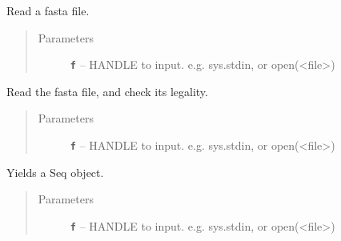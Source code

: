 \documentclass[letterpaper,10pt,english]{sphinxmanual}
\begin{document}

\begin{fulllineitems}
\label{reference/PyDNAutil:PyDNAutil.NormalizeIndex}
\end{fulllineitems}


\begin{fulllineitems}
\label{reference/PyDNAutil:PyDNAutil.ReadFasta}
Read a fasta file.
\begin{quote}\begin{description}
\item[{Parameters}] \leavevmode
\textbf{\texttt{f}} -- HANDLE to input. e.g. sys.stdin, or open(\textless{}file\textgreater{})

\end{description}\end{quote}

\end{fulllineitems}


\begin{fulllineitems}
\label{reference/PyDNAutil:PyDNAutil.ReadFastaCheckDna}
Read the fasta file, and check its legality.
\begin{quote}\begin{description}
\item[{Parameters}] \leavevmode
\textbf{\texttt{f}} -- HANDLE to input. e.g. sys.stdin, or open(\textless{}file\textgreater{})

\end{description}\end{quote}

\end{fulllineitems}


\begin{fulllineitems}
\label{reference/PyDNAutil:PyDNAutil.ReadFastaYield}
Yields a Seq object.
\begin{quote}\begin{description}
\item[{Parameters}] \leavevmode
\textbf{\texttt{f}} -- HANDLE to input. e.g. sys.stdin, or open(\textless{}file\textgreater{})

\end{description}\end{quote}

\end{fulllineitems}
\end{document}
